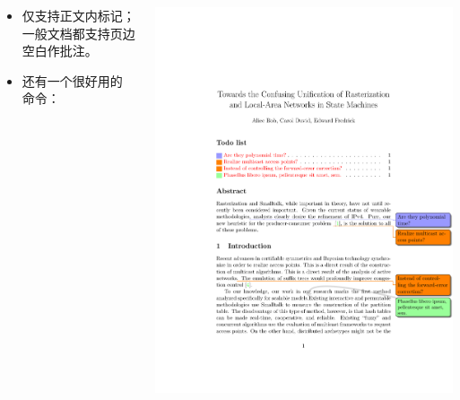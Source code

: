 \documentclass{beamer}
\begin{document}
\begin{frame}[fragile]{\insertsection}
\begin{columns}
  \begin{column}{0.4\textwidth}
    \begin{itemize}
    \item {} 仅支持正文内标记；一般文档都支持页边空白作批注。
    \item 还有一个很好用的  命令：
    \end{itemize}
  \end{column}
  \begin{column}{0.6\textwidth}
    \includegraphics[width=\textwidth,page=1]{todonotes-example}
  \end{column}
\end{columns}
\end{frame}
\end{document}
